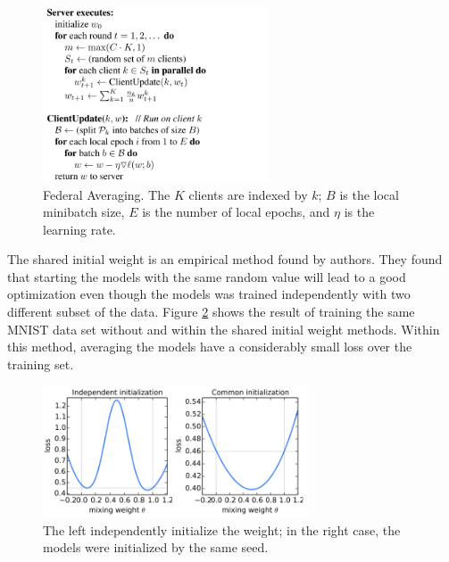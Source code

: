 \documentclass[article]{aaltoseries}
\begin{document}
\begin{figure}[t!]
  \begin{center}
    \includegraphics[width=0.6\textwidth]{figures/Algorithm}
    \caption{Federal Averaging. The $K$ clients are indexed by $k$; $B$ is the local minibatch size, 
            $E$ is the number of local epochs, and $η$ is the learning rate.}
    \label{alg:FederalAveragingAlgorithm}
  \end{center}
\end{figure}


The shared initial weight is an empirical method found by authors. They found that starting the models with the same random
value will lead to a good optimization even though the models was trained independently with two different subset of the data.
Figure \ref{fig:share_weight} shows the result of training the same MNIST data set \cite{lecun2010mnist} without and within the 
shared initial weight methods. 
Within this method, averaging the models have a considerably small loss over the training set.

\begin{figure}[t!]
  \begin{center}
    \includegraphics[width=0.7\textwidth]{figures/share_weight}
    \caption{The left independently initialize the weight; in the right case, the models were initialized by the same seed.}
    \label{fig:share_weight}
  \end{center}
\end{figure}
\end{document}
